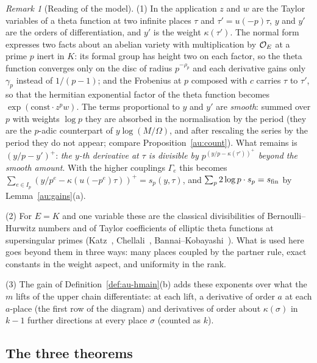 \documentclass[10pt]{amsart}
\theoremstyle{definition}
\theoremstyle{remark}
\newtheorem{remark}[theorem]{Remark}
\begin{document}
\begin{remark}[Reading of the model]\label{au:local-remark}
(1) In the application $z$ and $w$ are the Taylor variables of a theta function at two infinite
places $\tau$ and $\tau'=u(-p)\tau$, $y$ and $y'$ are the orders of differentiation, and $y'$ is
the weight $\kappa(\tau')$. The normal form expresses two facts about an abelian variety with
multiplication by $\mathcal O_E$ at a prime $p$ inert in $K$: its formal group has height two on each
factor, so the theta function converges only on the disc of radius $p^{-\rho_p}$ and each
derivative gains only $\gamma_p$ instead of $1/(p-1)$; and the Frobenius at $p$ composed with $c$
carries $\tau$ to $\tau'$, so that the hermitian exponential factor of the theta function becomes
$\exp(\text{const}\cdot z^pw)$. The terms proportional to $y$ and $y'$ are \emph{smooth}: summed
over $p$ with weights $\log p$ they are absorbed in the normalisation by the period (they are the
$p$-adic counterpart of $y\log(M/\Omega)$, and after rescaling the series by the period they
do not appear; compare Proposition~\ref{au:count}). What remains is $(y/p-y')^+$: \emph{the
$y$-th derivative at $\tau$ is divisible by $p^{(y/p-\kappa(\tau'))^+}$ beyond the smooth
amount}. With the higher couplings $\Gamma_e$ this becomes $\sum_{e\in I_p}(y/p^e-\kappa(u(-p^e)
\tau))^+=s_p(y,\tau)$, and $\sum_p2\log p\cdot s_p=s_{\mathrm{fin}}$ by Lemma~\ref{au:gains}(a).

(2) For $E=K$ and one variable these are the classical divisibilities of Bernoulli--Hurwitz
numbers and of Taylor coefficients of elliptic theta functions at supersingular primes
(Katz~\cite{KatzDivisibilities}, Chellali~\cite{Chellali},
Bannai--Kobayashi~\cite{BannaiKobayashi}). What is used here goes beyond them in three ways: many
places coupled by the partner rule, exact constants in the weight aspect, and uniformity in the
rank.

(3) The gain of Definition~\ref{def:au-hmain}(b) adds these exponents over what the $m$ lifts of
the upper chain differentiate: at each lift, a derivative of order $a$ at each $a$-place (the
first row of the diagram) and derivatives of order about $\kappa(\sigma)$ in $k-1$ further
directions at every place $\sigma$ (counted as $k$).
\end{remark}


\subsection{The three theorems}\label{ss:au-ABC}
\end{document}
